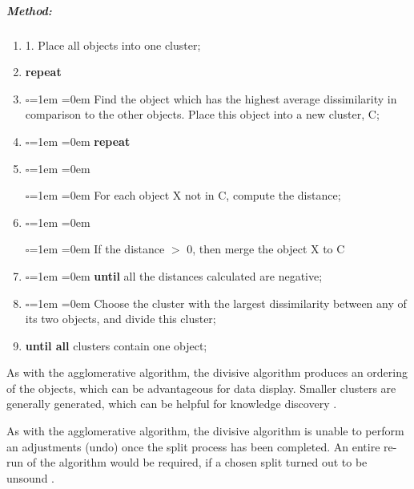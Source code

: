 \subparagraph*{Method:}
\begin{enumerate}
  \item 1.  Place all objects into one cluster;
  \item {\bf repeat}
  \item \begin{list}{$\square$}{\leftmargin=1em \itemindent=0em}
          Find the object which has the highest average dissimilarity in 
          comparison to the other objects. Place this object into a new 
          cluster, C;
        \end{list}
  \item \begin{list}{$\square$}{\leftmargin=1em \itemindent=0em}
          {\bf repeat}
        \end{list}   
  \item \begin{list}{$\square$}{\leftmargin=1em \itemindent=0em}
          \begin{list}{$\square$}{\leftmargin=1em \itemindent=0em}
            For each object X not in C, compute the distance;
          \end{list}  
        \end{list}        
  \item \begin{list}{$\square$}{\leftmargin=1em \itemindent=0em}
          \begin{list}{$\square$}{\leftmargin=1em \itemindent=0em}
            If the distance $>$ 0, then merge the object X to C
          \end{list}  
        \end{list}   
  \item \begin{list}{$\square$}{\leftmargin=1em \itemindent=0em}
          {\bf until} all the distances calculated are negative;
        \end{list} 
  \item \begin{list}{$\square$}{\leftmargin=1em \itemindent=0em}
          Choose the cluster with the largest dissimilarity between any of its 
          two objects, and divide this cluster;
        \end{list} 
  \item {\bf until all} clusters contain one object;
\end{enumerate}

As with the agglomerative algorithm, the divisive algorithm produces an ordering
of the objects, which can be advantageous for data display. Smaller clusters 
are generally generated, which can be helpful for knowledge discovery 
\citep{iosHierarchical}.

As with the agglomerative algorithm, the divisive algorithm is unable to 
perform an adjustments (undo) once the split process has been completed. An 
entire re-run of the algorithm would be required, if a chosen split turned out
to be unsound \citep{tan05}.
